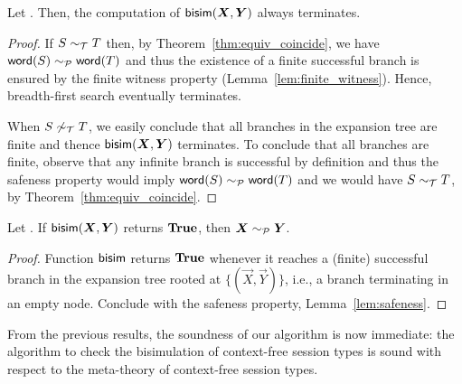 \begin{lemma}[Termination]
  \label{lem:termination}
  Let \grmcontext. Then, the computation of $\Bisim(\vec X,\vec Y)$
  always terminates.
\end{lemma}
%
\begin{proof}
  If $S\sim_\mathcal T T$ then, by Theorem~\ref{thm:equiv_coincide}, we
  have $\mathsf{word}(S) \sim_\mathcal P \mathsf{word}(T) $ and thus the existence of a
  finite successful branch is ensured by the finite witness property
  (Lemma~\ref{lem:finite_witness}).  Hence, breadth-first search
  eventually terminates.
  
  When $S\not\sim_\mathcal T T$, we easily conclude that all branches in
  the expansion tree are finite and thence $\Bisim(\vec X,\vec Y)$
  terminates.  To conclude that all branches are finite, observe that
  any infinite branch is successful by definition and thus the
  safeness property would imply $\mathsf{word}(S) \sim_\mathcal P \mathsf{word}(T)$ and we would have
  $S\sim_\mathcal T T$, by Theorem~\ref{thm:equiv_coincide}.
\end{proof}


\begin{lemma}
  \label{lem:bisimilar-to-prod}
  Let \grmcontext.  If $\Bisim(\vec X,\vec Y)$ returns $\mathbf{True}$, then
  $\vec X \ProdEquiv \vec Y$.
\end{lemma}

\begin{proof}
  Function $\mathsf{bisim}$ returns $\mathbf{True}$ whenever it reaches a (finite)
  successful branch in the expansion tree rooted at
  $\{(\vec X,\vec Y)\}$, i.e., a branch terminating in an empty node. 
  Conclude with the safeness property,
  Lemma~\ref{lem:safeness}.
\end{proof}

From the previous results, the soundness of our algorithm is now
immediate: the algorithm to check the bisimulation of context-free
session types is sound with respect to
the meta-theory of context-free session types.


